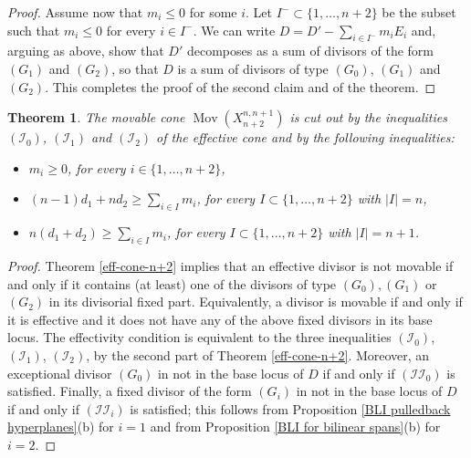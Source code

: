 \documentclass[a4paper,11pt]{article}
\newtheorem{theorem}{Theorem}[section]
\newcommand{\Mov}{\operatorname{Mov}}
\begin{document}
\begin{proof}
Assume now that $m_i\le0$ for some $i$.
Let  $I^-\subset \{1,\dots,n+2\}$ be the subset such that $m_i\le0$ for  every $i\in I^-$. We can write $D=D'-\sum_{i \in I^-}m_iE_i$ and, arguing as above, show that $D'$ decomposes as a sum of divisors of the form $(G_1)$ and $(G_2)$, so that $D$ is a sum of divisors of type $(G_0)$, $(G_1)$ and $(G_2)$.
This completes the proof of the second claim and of the theorem.
\end{proof}
   
\begin{theorem}\label{mov-cone-n+2}
The movable cone $\Mov(X^{n,n+1}_{n+2})$ is cut out by the inequalities $(\mathcal{I}_0)$, $(\mathcal{I}_1)$ and $(\mathcal{I}_2)$ of the effective cone and by the following inequalities:
\begin{itemize}
\item[($\mathcal{II}_0$)] $m_i\ge0$, for every $i\in\{1,\dots,n+2\}$, 
\item[($\mathcal{II}_1$)]  $(n-1)d_1+nd_2 \ge \sum_{i\in I}m_i$, for every $I\subset\{1,\dots, n+2\}$ with $|I|=n$,
\item[($\mathcal{II}_2$)]  $n(d_1+d_2)\ge \sum_{i\in I}m_i$, for every $I\subset\{1,\dots, n+2\}$ with $|I|=n+1$.
\end{itemize}
\end{theorem}
\begin{proof}
Theorem \ref{eff-cone-n+2} implies that an effective divisor is not movable if and only if it contains (at least) one of the divisors of type $(G_0), (G_1)$ or $(G_2)$ in its divisorial fixed part. 
Equivalently, a divisor is movable if and only if it is effective and it does not have any of the above fixed divisors in its base locus. 
The effectivity condition is equivalent to the three inequalities $(\mathcal{I}_0)$, $(\mathcal{I}_1)$, $(\mathcal{I}_2)$, by the second part of Theorem \ref{eff-cone-n+2}. Moreover, an exceptional divisor $(G_0)$ in not in the base locus of $D$ if and only if $(\mathcal{II}_0)$ is satisfied. 
Finally, a fixed divisor of the form $(G_i)$ in not in the base locus of $D$ if and only if $(\mathcal{II}_i)$ is satisfied; this follows from Proposition \ref{BLI pulledback hyperplanes}(b)  for $i=1$ and from Proposition \ref{BLI for bilinear spans}(b) for $i=2$.
\end{proof}
\end{document}
